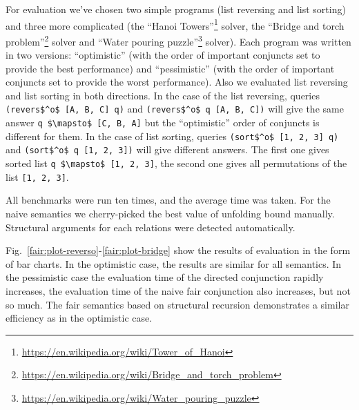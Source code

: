 For evaluation we've chosen two simple programs (list reversing and list sorting) and three more complicated (the ``Hanoi Towers''\footnote{\url{https://en.wikipedia.org/wiki/Tower_of_Hanoi}} solver, the
``Bridge and torch problem''\footnote{\url{https://en.wikipedia.org/wiki/Bridge_and_torch_problem}} solver and ``Water pouring puzzle''\footnote{\url{https://en.wikipedia.org/wiki/Water_pouring_puzzle}} solver).
Each program was written in two versions: ``optimistic'' (with the order of important conjuncts set to provide the best performance) and ``pessimistic'' (with the order of important
conjuncts set to provide the worst performance). Also we evaluated list reversing and list sorting in both directions. In the case of the list reversing, queries
\lstinline{(revers$^o$ [A, B, C] q)} and \lstinline{(revers$^o$ q [A, B, C])}\! will give the same answer \lstinline{q $\mapsto$ [C, B, A]} but the ``optimistic'' order of conjuncts is different
for them. In the case of list sorting, queries \lstinline{(sort$^o$ [1, 2, 3] q)} and \lstinline{(sort$^o$ q [1, 2, 3])} will give different answers. The first one gives sorted list
\lstinline{q $\mapsto$ [1, 2, 3]}, the second one gives all permutations of the list \lstinline{[1, 2, 3]}. 

All benchmarks were run ten times, and the average time was taken. For the naive  semantics we cherry-picked the best value of unfolding bound manually. Structural arguments for each relations were detected automatically.

Fig.~\ref{fair:plot-reverso}-\ref{fair:plot-bridge} show the results of evaluation in the form of bar charts. In the optimistic case, the results are similar for all semantics.
In the pessimistic case the evaluation time of the directed conjunction rapidly increases, the evaluation time of the naive fair conjunction also increases, but not so much.
The fair semantics based on structural recursion demonstrates a similar efficiency as in the optimistic case.


